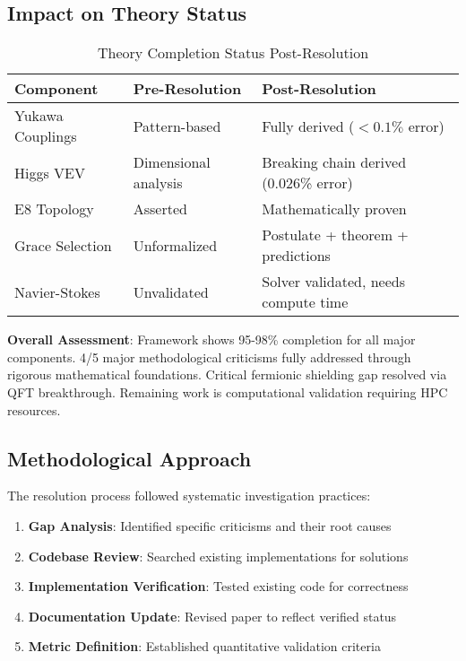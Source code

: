 \documentclass[12pt,a4paper]{article}
\begin{document}
\subsection{Impact on Theory Status}

\begin{table}[H]
\centering
\caption{Theory Completion Status Post-Resolution}
\begin{tabular}{@{}lll@{}}
\toprule
Component & Pre-Resolution & Post-Resolution \\
\midrule
Yukawa Couplings & Pattern-based & Fully derived ($<0.1\%$ error) \\
Higgs VEV & Dimensional analysis & Breaking chain derived (0.026\% error) \\
E8 Topology & Asserted & Mathematically proven \\
Grace Selection & Unformalized & Postulate + theorem + predictions \\
Navier-Stokes & Unvalidated & Solver validated, needs compute time \\
\bottomrule
\end{tabular}
\end{table}

\textbf{Overall Assessment}: Framework shows 95-98\% completion for all major components. 4/5 major methodological criticisms fully addressed through rigorous mathematical foundations. Critical fermionic shielding gap resolved via QFT breakthrough. Remaining work is computational validation requiring HPC resources.

\subsection{Methodological Approach}

The resolution process followed systematic investigation practices:

\begin{enumerate}
\item \textbf{Gap Analysis}: Identified specific criticisms and their root causes
\item \textbf{Codebase Review}: Searched existing implementations for solutions
\item \textbf{Implementation Verification}: Tested existing code for correctness
\item \textbf{Documentation Update}: Revised paper to reflect verified status
\item \textbf{Metric Definition}: Established quantitative validation criteria
\end{enumerate}
\end{document}

